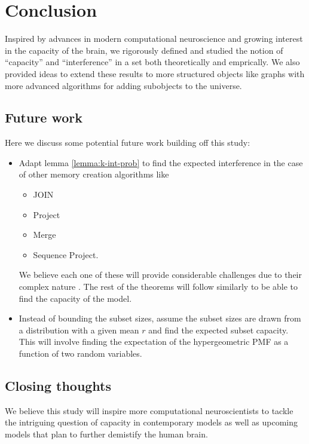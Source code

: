 \chapter{Conclusion}

Inspired by advances in modern computational neuroscience and growing interest in the capacity of the brain, we rigorously defined and studied the notion of ``capacity'' and ``interference'' in a set both theoretically and emprically. We also provided ideas to extend these results to more structured objects like graphs with more advanced algorithms for adding subobjects to the universe.

\section{Future work}

Here we discuss some potential future work building off this study:

\begin{itemize}
    \item Adapt lemma \ref{lemma:k-int-prob} to find the expected interference in the case of other memory creation algorithms like \begin{itemize}
        \item JOIN
        \item Project
        \item Merge
        \item Sequence Project. 
    \end{itemize}
    We believe each one of these will provide considerable challenges due to their complex nature \cite{dabagia2023computation, papadimitriou2020brain,valiant2005memorization}. The rest of the theorems will follow similarly to be able to find the capacity of the model.
    \item Instead of bounding the subset sizes, assume the subset sizes are drawn from a distribution with a given mean $r$ and find the expected subset capacity. This will involve finding the expectation of the hypergeometric PMF as a function of two random variables. 
\end{itemize}

\section{Closing thoughts}

We believe this study will inspire more computational neuroscientists to tackle the intriguing question of capacity in contemporary models as well as upcoming models that plan to further demistify the human brain. 
